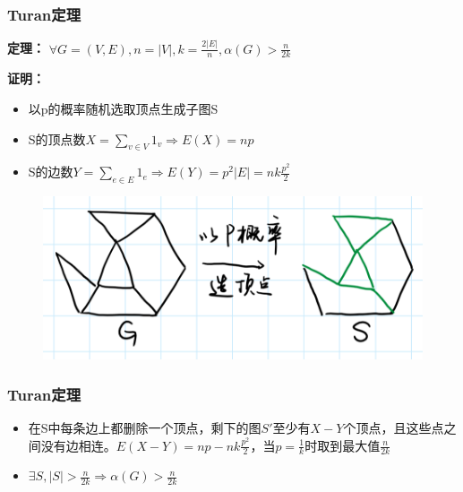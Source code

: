 \documentclass[AutoFakeBold]{beamer}
\begin{document}
{\begin{frame}
    \end{frame}

    \begin{frame}
        \frametitle{Turan定理}
    
        \textbf{定理：} \(\forall G=(V,E),n=|V|,k=\frac{2|E|}{n},\alpha(G)>\frac{n}{2k}\)

        \textbf{证明：}

        \begin{itemize}
            \item 以p的概率随机选取顶点生成子图S
            \item S的顶点数\(X=\sum_{v\in V} 1_v\Rightarrow E(X)=np\)
            \item S的边数\(Y=\sum_{e\in E} 1_e\Rightarrow E(Y)=p^2|E|=nk\frac{p^2}{2}\)
        \end{itemize}

        \begin{figure}
            \centering
            \includegraphics[scale=.5]{figures/1.png}
        \end{figure}
    
    \end{frame}

    \begin{frame}
        \frametitle{Turan定理}
        \begin{itemize}
            \item 在S中每条边上都删除一个顶点，剩下的图\(S'\)至少有\(X-Y\)个顶点，且这些点之间没有边相连。\(E(X-Y)=np-nk\frac{p^2}{2}\)，当\(p=\frac{1}{k}\)时取到最大值\(\frac{n}{2k}\)
            \item \(\exists S, |S|>\frac{n}{2k}\Rightarrow \alpha(G)>\frac{n}{2k}\)
        \end{itemize}


\end{frame}}
\end{document}
